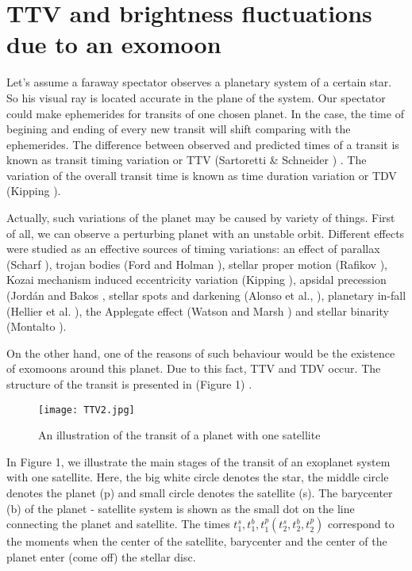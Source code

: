 \documentclass[12pt]{article}
\begin{document}
 \section{TTV and brightness fluctuations due to an exomoon }

Let's assume a faraway spectator observes a planetary system of a certain star. So his visual ray is located accurate in the plane of the system. Our spectator could make ephemerides for transits of one chosen planet. In the case, the time of begining and ending of every new transit will shift comparing with the ephemerides. The difference between observed and predicted times of a transit is known as transit timing variation or TTV (Sartoretti \& Schneider \cite{sartoret}) . The variation of the overall transit time is known as time duration variation or TDV (Kipping \cite{kipp1}).

Actually, such variations of the planet may be caused by variety of things. First of all, we can observe a perturbing planet with an unstable orbit. Different effects were studied as an effective sources of timing variations:  
an effect of parallax (Scharf \cite{schar}), trojan bodies (Ford and Holman \cite{ford}), stellar proper motion (Rafikov \cite{rafik}), Kozai mechanism induced eccentricity variation (Kipping \cite{kipp0}), apsidal precession (Jord\'an and Bakos \cite{jord}, stellar spots and darkening (Alonso et al., \cite{alonso}), planetary in-fall (Hellier et al. \cite{hell}), the Applegate effect (Watson and Marsh \cite{watson}) and stellar binarity (Montalto \cite{monta}).

On the other hand, one of the reasons of such behaviour would be the existence of exomoons around this planet. Due to this fact, TTV and TDV occur. The structure of the transit is presented in (Figure 1) .
 
 
 \begin{figure}[h]
\centering
\texttt{[image: TTV2.jpg]}
\caption{  An illustration of the transit of a planet with one satellite }
\label{fig:figure2}
\end{figure}

In Figure 1, we illustrate the main stages of the transit of an exoplanet system with one satellite. Here, the big white circle denotes the star, the middle circle denotes the planet (p) and small circle denotes the satellite (s). The barycenter (b) of the planet - satellite system is shown as the small dot on the line
connecting the planet and satellite. The times $t^s_1,t^b_1,t^p_1 (t^s_2,t^b_2,t^p_2)$ correspond to the moments when the center of the satellite, barycenter and the center of the planet enter (come off) the stellar disc.
\end{document}
